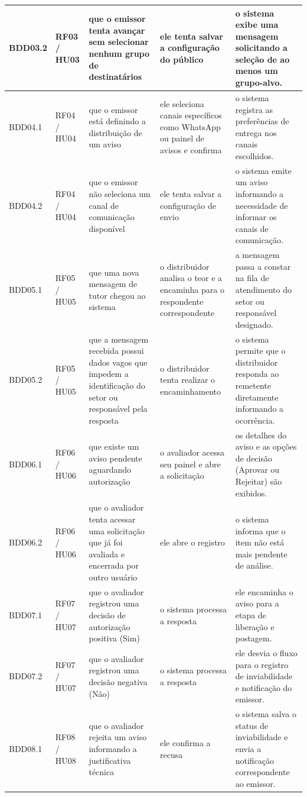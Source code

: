 \documentclass[a4paper,12pt]{report}
\begin{document}
\begin{longtable}{|p{1.6cm}|p{1.6cm}|p{3.6cm}|p{3.6cm}|p{4.0cm}|}
\hline
BDD03.2 & RF03 / HU03 & que o emissor tenta avançar sem selecionar nenhum grupo de destinatários & ele tenta salvar a configuração do público & o sistema exibe uma mensagem solicitando a seleção de ao menos um grupo-alvo. \\
\hline
BDD04.1 & RF04 / HU04 & que o emissor está definindo a distribuição de um aviso & ele seleciona canais específicos como WhatsApp ou painel de avisos e confirma & o sistema registra as preferências de entrega nos canais escolhidos. \\
\hline
BDD04.2 & RF04 / HU04 & que o emissor não seleciona um canal de comunicação disponível & ele tenta salvar a configuração de envio & o sistema emite um aviso informando a necessidade de informar os canais de comunicação. \\
\hline
BDD05.1 & RF05 / HU05 & que uma nova mensagem de tutor chegou ao sistema & o distribuidor analisa o teor e a encaminha para o respondente correspondente & a mensagem passa a constar na fila de atendimento do setor ou responsável designado. \\
\hline
BDD05.2 & RF05 / HU05 & que a mensagem recebida possui dados vagos que impedem a identificação do setor ou responsável pela resposta & o distribuidor tenta realizar o encaminhamento & o sistema permite que o distribuidor responda ao remetente diretamente informando a ocorrência. \\
\hline
BDD06.1 & RF06 / HU06 & que existe um aviso pendente aguardando autorização & o avaliador acessa seu painel e abre a solicitação & os detalhes do aviso e as opções de decisão (Aprovar ou Rejeitar) são exibidos. \\
\hline
BDD06.2 & RF06 / HU06 & que o avaliador tenta acessar uma solicitação que já foi avaliada e encerrada por outro usuário & ele abre o registro & o sistema informa que o item não está mais pendente de análise. \\
\hline
BDD07.1 & RF07 / HU07 & que o avaliador registrou uma decisão de autorização positiva (Sim) & o sistema processa a resposta & ele encaminha o aviso para a etapa de liberação e postagem. \\
\hline
BDD07.2 & RF07 / HU07 & que o avaliador registrou uma decisão negativa (Não) & o sistema processa a resposta & ele desvia o fluxo para o registro de inviabilidade e notificação do emissor. \\
\hline
BDD08.1 & RF08 / HU08 & que o avaliador rejeita um aviso informando a justificativa técnica & ele confirma a recusa & o sistema salva o status de inviabilidade e envia a notificação correspondente ao emissor. \\

\end{longtable}
\end{document}
